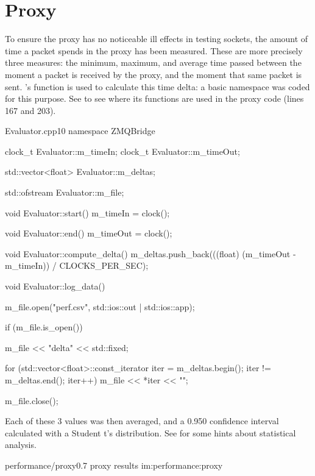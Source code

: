 \section{Proxy}\label{sc:performance:proxy}



To ensure the \gls{proxy} has no noticeable ill effects in testing  sockets, the amount of time a packet spends in the \gls{proxy} has been measured. These are more precisely three measures: the minimum, maximum, and average time passed between the moment a packet is received by the \gls{proxy}, and the moment that same packet is sent. 's  function is used to calculate this time delta: a basic  namespace was coded for this purpose. See  to see where its functions are used in the proxy code (lines \num{167} and \num{203}).

\begin{codelist}{Evaluator.cpp}{10}
namespace ZMQBridge {

clock_t Evaluator::m_timeIn;
clock_t Evaluator::m_timeOut;

std::vector<float> Evaluator::m_deltas;

std::ofstream Evaluator::m_file;

void Evaluator::start() {
    m_timeIn = clock();
}

void Evaluator::end() {
    m_timeOut = clock();
}

void Evaluator::compute_delta() {
    m_deltas.push_back(((float) (m_timeOut - m_timeIn)) / CLOCKS_PER_SEC);
}

void Evaluator::log_data() {
    m_file.open("perf.csv", std::ios::out | std::ios::app);

    if (m_file.is_open()) {
        m_file << "delta\n"
               << std::fixed;

        for (std::vector<float>::const_iterator iter = m_deltas.begin(); iter != m_deltas.end(); iter++) {
            m_file << *iter << "\n";
        }
    }

    m_file.close();
}

}
\end{codelist}

\FLOATnoindent Each of these \num{3} values was then averaged, and a \num{0,950} confidence interval calculated with a Student t's distribution. See  for some hints about statistical analysis.

\begin{image}
	{performance/proxy}{0.7}
	{proxy results}
	{im:performance:proxy}
	{}
	{}
\end{image}

